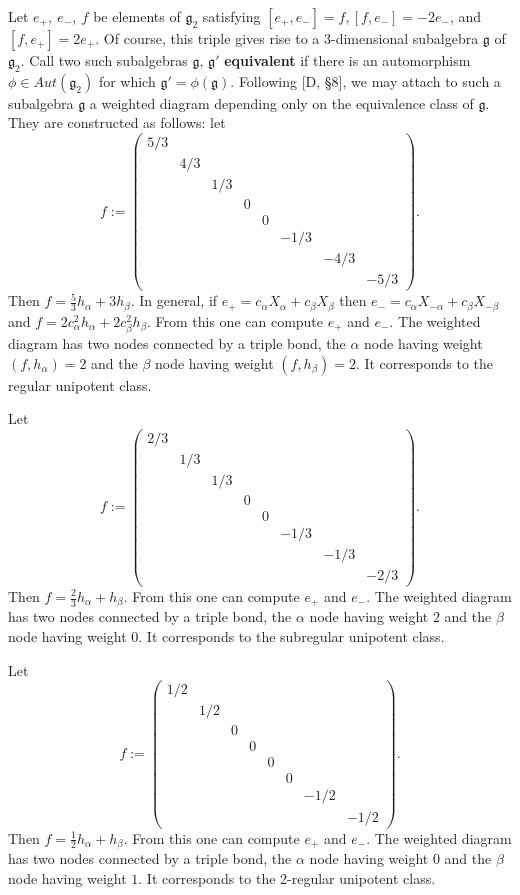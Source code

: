 \documentclass[12pt,letterpaper]{amsart}
\begin{document}
Let $e_+,\ e_-, \ f$ be elements of ${\mathfrak g}_2$ satisfying
$[e_+,e_-]=f,[f,e_-]=-2e_-$, and $[f,e_+]=2e_+$. Of course,
this triple gives rise to a 3-dimensional subalgebra ${\mathfrak g}$
of ${\mathfrak g}_2$. Call two such subalgebras ${\mathfrak g}$,
${\mathfrak g}'$ \textbf{equivalent} if there is an automorphism
$\phi\in Aut({\mathfrak g}_2)$ for which ${\mathfrak g}'=\phi({\mathfrak g})$.
Following [D, \S 8], we may attach to
such a subalgebra ${\mathfrak g}$ a weighted diagram depending only on the
equivalence class of ${\mathfrak g}$. They are constructed as follows:
let
\[
f:= \begin{pmatrix} 5/3&&&&&&& \\
&4/3&&&&&& \\
&&1/3&&&&& \\
&&&0&&&& \\
&&&&0&&& \\
&&&&&-1/3&& \\
&&&&&&-4/3& \\
&&&&&&&-5/3
\end{pmatrix}.
\]
Then $f=\frac{5}{3}h_\alpha +3h_\beta$. In general, if
$e_+=c_\alpha X_\alpha +c_\beta X_\beta$ then
$e_-=c_\alpha X_{-\alpha} +c_\beta X_{-\beta}$ and
$f=2c_\alpha^2 h_\alpha +2c_\beta^2 h_\beta$. From this one can compute
$e_+$ and $e_-$. The weighted diagram has two nodes connected by
a triple bond, the $\alpha$ node having weight $(f,h_\alpha)=2$ and the
$\beta$ node having weight $(f,h_\beta)=2$.
It corresponds to the regular unipotent class.

Let
\[
f:= \begin{pmatrix} 2/3&&&&&&& \\
&1/3&&&&&& \\
&&1/3&&&&& \\
&&&0&&&& \\
&&&&0&&& \\
&&&&&-1/3&& \\
&&&&&&-1/3& \\
&&&&&&&-2/3
\end{pmatrix}.
\]
Then $f=\frac{2}{3}h_\alpha +h_\beta$. From this one can compute
$e_+$ and $e_-$. The weighted diagram has two nodes connected by
a triple bond, the $\alpha$ node having weight $2$ and the
$\beta$ node having weight $0$. It corresponds to the subregular unipotent
class.

Let
\[
f:= \begin{pmatrix} 1/2&&&&&&& \\
&1/2&&&&&& \\
&&0&&&&& \\
&&&0&&&& \\
&&&&0&&& \\
&&&&&0&& \\
&&&&&&-1/2& \\
&&&&&&&-1/2
\end{pmatrix}.
\]
Then $f=\frac{1}{2}h_\alpha +h_\beta$. From this one can compute
$e_+$ and $e_-$. The weighted diagram has two nodes connected by
a triple bond, the $\alpha$ node having weight $0$ and the
$\beta$ node having weight $1$. It corresponds to the 2-regular unipotent
class.
\end{document}
